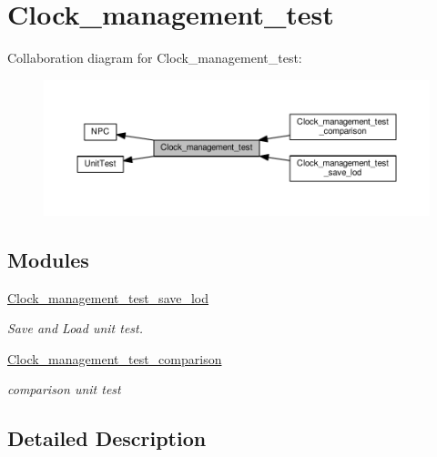 \hypertarget{group__clock__management__test}{}\section{Clock\+\_\+management\+\_\+test}
\label{group__clock__management__test}
Collaboration diagram for Clock\+\_\+management\+\_\+test\+:\nopagebreak
\begin{figure}[H]
\begin{center}
\leavevmode
\includegraphics[width=350pt]{dc/d21/group__clock__management__test}
\end{center}
\end{figure}
\subsection*{Modules}
\begin{DoxyCompactItemize}
\item 
\hyperlink{group__clock__management__test__save__lod}{Clock\+\_\+management\+\_\+test\+\_\+save\+\_\+lod}
\begin{DoxyCompactList}\small\item\em Save and Load unit test. \end{DoxyCompactList}\item 
\hyperlink{group__clock__management__test__comparison}{Clock\+\_\+management\+\_\+test\+\_\+comparison}
\begin{DoxyCompactList}\small\item\em comparison unit test \end{DoxyCompactList}\end{DoxyCompactItemize}


\subsection{Detailed Description}
